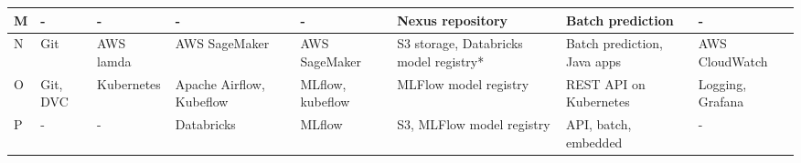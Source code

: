 \begin{table*}[ht]
{\begin{tabular}{lp{}p{}p{2cm}p{2cm}p{}p{}p{2cm}}
         M & - & -& -&- & 
         Nexus repository & Batch prediction & -
          \\  \hline

         N & Git & AWS lamda & AWS SageMaker & AWS SageMaker & S3 storage, Databricks model registry* & Batch prediction, Java apps & AWS CloudWatch
          \\  \hline

         O & Git, DVC & Kubernetes & Apache Airflow, Kubeflow & MLflow, kubeflow & MLFlow model registry & REST API on Kubernetes & Logging, Grafana
          \\  \hline

         P & - & - & Databricks & MLflow & S3, MLFlow model registry & API, batch, embedded & -
          \\  

         \bottomrule

    \end{tabular}}
    \DIFaddendFL \label{tab:databases}
\end{table*}
